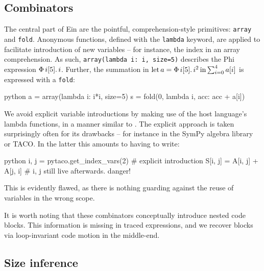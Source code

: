\subsection{Combinators}

The central part of Ein are the pointful, comprehension-style primitives: \texttt{array} and \texttt{fold}. Anonymous functions, defined with the \texttt{lambda} keyword, are applied to facilitate introduction of new variables -- for instance, the index in an array comprehension. As such, \texttt{array(lambda i: i, size=5)} describes the Phi expression $\Phi\, {i}[{5}] \ldotp {i}$. Further, the summation in $\mathrm{let}\,{a}={\Phi\, {i}[{5}] \ldotp {i^2}}\,\mathrm{in}\,{ \sum_{i=0}^{4} a[i]}$ is expressed with a \texttt{fold}:
\begin{center}
\begin{cminted}{python}
a = array(lambda i: i*i, size=5)
s = fold(0, lambda i, acc: acc + a[i])
\end{cminted}
\end{center}
We avoid explicit variable introductions by making use of the host language's lambda functions, in a manner similar to \textcite{atkey2009unembedding}. The explicit approach is taken surprisingly often for its drawbacks -- for instance in the SymPy algebra library or TACO. In the latter this amounts to having to write:
\begin{center}
\begin{cminted}{python}
i, j = pytaco.get_index_vars(2)  # explicit introduction
S[i, j] = A[i, j] + A[j, i]      # i, j still live afterwards. danger!
\end{cminted}
\end{center}
This is evidently flawed, as there is nothing guarding against the reuse of variables in the wrong scope. 

It is worth noting that these combinators conceptually introduce nested code blocks. This information is missing in traced expressions, and we recover blocks via loop-invariant code motion in the middle-end.

\subsection{Size inference}

